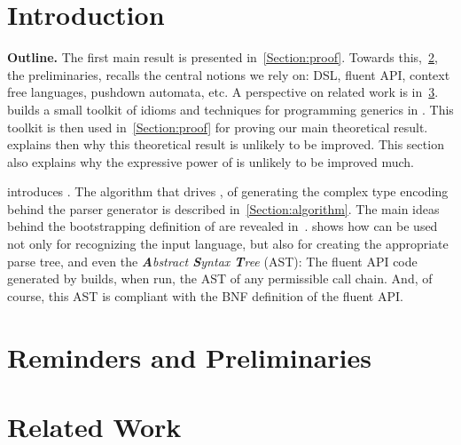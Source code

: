 \documentclass[a4paper,USenglish]{lipics}
\author{Anonymized for the submission}
\begin{document}
\maketitle
\begin{abstract}
  
\end{abstract}

\section{Introduction}


\textbf{Outline.}
The first main result is presented in~\cref{Section:proof}.
Towards this,~\cref{Section:preliminaries}, the preliminaries, 
  recalls the central notions we rely on: DSL, fluent API,
  context free languages, pushdown automata, etc. 
A perspective on related work is
  in~\cref{Section:related}.
 builds a small toolkit of idioms and techniques
  for programming generics in \Java.
This toolkit is then used in~\cref{Section:proof} for
  proving our main theoretical result.
 explains then why
  this theoretical result is unlikely to be improved.
This section also explains why the expressive power of \Self
  is unlikely to be improved much.

 introduces \Self.
The algorithm that drives \Self, of generating the complex
  type encoding behind the parser generator
  is described in~\cref{Section:algorithm}.
The main ideas behind the bootstrapping definition of \Self
  are revealed in~.
 shows how \Self can be used not only
  for recognizing the input language,
  but also for creating the appropriate parse tree, and even the \emph{\textbf Abstract \textbf Syntax \textbf Tree} (AST):
  The fluent API code generated by \Self builds,
    when run, the AST of any permissible call chain.
    And, of course, this AST is compliant with the BNF definition
      of the fluent API.

\section{Reminders and Preliminaries}
\label{Section:preliminaries}


\section{Related Work}
\label{Section:related}
%
\end{document}
